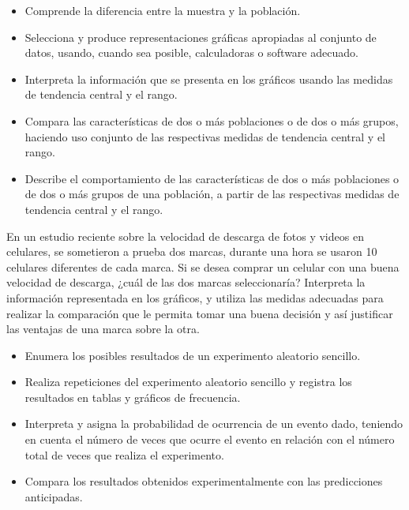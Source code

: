 \evidencias

\begin{itemize}
  \item Comprende la diferencia entre la muestra y la población.
  \item Selecciona y produce representaciones gráficas apropiadas al conjunto de datos, usando, cuando sea posible, calculadoras o software adecuado.
  \item Interpreta la información que se presenta en los gráficos usando las medidas de tendencia central y el rango.
  \item Compara las características de dos o más poblaciones o de dos o más grupos, haciendo uso conjunto de las respectivas medidas de tendencia central y el rango.
  \item Describe el comportamiento de las características de dos o más poblaciones o de dos o más grupos de una población, a partir de las respectivas medidas de tendencia central y el rango.
\end{itemize}

\ejemplo

En un estudio reciente sobre la velocidad de descarga de fotos y videos en celulares, se sometieron a prueba dos marcas, durante una hora se usaron 10 celulares diferentes de cada marca. Si se desea comprar un celular con una buena velocidad de descarga, ¿cuál de las dos marcas seleccionaría? Interpreta la información representada en los gráficos, y utiliza las medidas adecuadas para realizar la comparación que le permita tomar una buena decisión y así justificar las ventajas de una marca sobre la otra.




\evidencias

\begin{itemize}
  \item Enumera los posibles resultados de un experimento aleatorio sencillo.
  \item Realiza repeticiones del experimento aleatorio sencillo y registra los resultados en tablas y gráficos de frecuencia.
  \item Interpreta y asigna la probabilidad de ocurrencia de un evento dado, teniendo en cuenta el número de veces que ocurre el evento en relación con el número total de veces que realiza el experimento.
  \item Compara los resultados obtenidos experimentalmente con las predicciones anticipadas.
\end{itemize}

